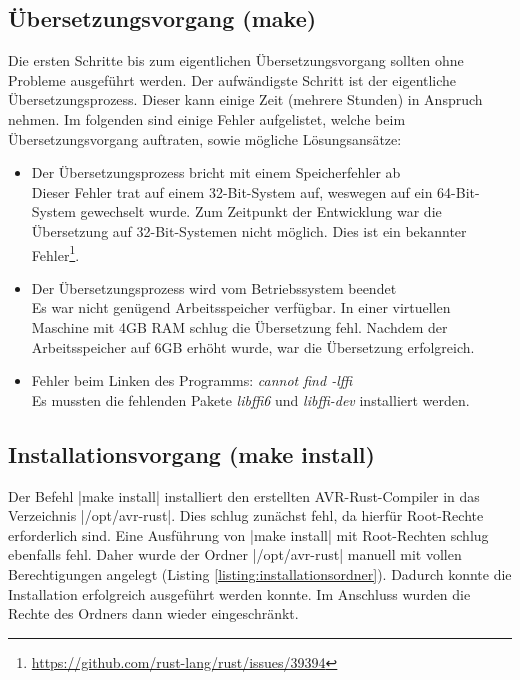 \documentclass
[ 12pt,
  parskip=half %
]{scrreprt}
\begin{document}
\newpage
\subsection{Übersetzungsvorgang (make)}

Die ersten Schritte bis zum eigentlichen Übersetzungsvorgang sollten ohne Probleme ausgeführt werden. Der aufwändigste Schritt ist der eigentliche Übersetzungsprozess. Dieser kann einige Zeit (mehrere Stunden) in Anspruch nehmen. Im folgenden sind einige Fehler aufgelistet, welche beim Übersetzungsvorgang auftraten, sowie mögliche Lösungsansätze:

\begin{itemize}
	\item Der Übersetzungsprozess bricht mit einem Speicherfehler ab 
		\smallskip \\
		Dieser Fehler trat auf einem 32-Bit-System auf, weswegen auf ein 64-Bit-System gewechselt wurde. Zum Zeitpunkt der Entwicklung war die Übersetzung auf 32-Bit-Systemen nicht möglich. Dies ist ein bekannter Fehler\footnote{\url{https://github.com/rust-lang/rust/issues/39394}}.
	\item Der Übersetzungsprozess wird vom Betriebssystem beendet 
	\smallskip \\
	Es war nicht genügend Arbeitsspeicher verfügbar. In einer virtuellen Maschine mit 4GB RAM schlug die Übersetzung fehl. Nachdem der Arbeitsspeicher auf 6GB erhöht wurde, war die Übersetzung erfolgreich.
	\item Fehler beim Linken des Programms: \textit{cannot find -lffi}
	\smallskip \\
	Es mussten die fehlenden Pakete \textit{libffi6} und \textit{libffi-dev} installiert werden.
\end{itemize}

\subsection{Installationsvorgang (make install)}

Der Befehl \bashinline|make install| installiert den erstellten AVR-Rust-Compiler in das Verzeichnis \bashinline|/opt/avr-rust|. Dies schlug zunächst fehl, da hierfür Root-Rechte erforderlich sind. Eine Ausführung von \bashinline|make install| mit Root-Rechten schlug ebenfalls fehl. Daher wurde der Ordner \bashinline|/opt/avr-rust| manuell mit vollen Berechtigungen angelegt (Listing \ref{listing:installationsordner}). Dadurch konnte die Installation erfolgreich ausgeführt werden konnte. Im Anschluss wurden die Rechte des Ordners dann wieder eingeschränkt.
\end{document}
